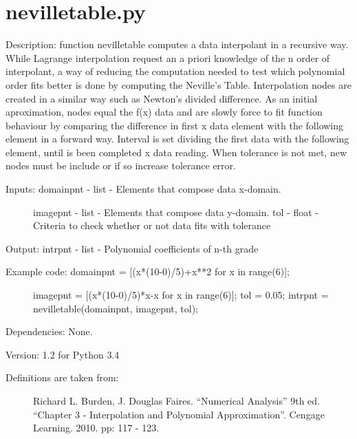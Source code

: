 \documentclass[letterpaper,10pt,oneside]{sphinxmanual}
\theoremstyle{plain}%
\theoremstyle{definition}%
\theoremstyle{remark}%
\begin{document}
\section{nevilletable.py}
\label{code:nevilletable-py}\label{code:module-nevilletable}
Description: function nevilletable computes a data interpolant in a recursive
way.  While Lagrange interpolation request an a priori knowledge of the n
order of interpolant, a way of reducing the computation needed to test
which polynomial order fits better is done by computing the Neville's Table.
Interpolation nodes are created in a similar way such as Newton's divided
difference. As an initial aproximation, nodes equal the f(x) data and are
slowly force to fit function behaviour by comparing the difference in first 
x data element with the following element in a forward way. Interval is set
dividing the first data with the following element, until is been completed
x data reading. When tolerance is not met, new nodes must be include or if 
so increase tolerance error.
\begin{description}
\item[{Inputs: domainpnt - list - Elements that compose data x-domain. }] \leavevmode
imagepnt - list - Elements that compose data y-domain.
tol - float - Criteria to check whether or not data fits with tolerance

\end{description}

Output: intrpnt - list - Polynomial coefficients of n-th grade
\begin{description}
\item[{Example code: domainpnt = {[}(x*(10-0)/5)+x**2 for x in range(6){]};}] \leavevmode
imagepnt = {[}(x*(10-0)/5)*x-x for x in range(6){]};
tol = 0.05;
intrpnt = nevilletable(domainpnt, imagepnt, tol);

\end{description}

Dependencies: None.

Version: 1.2 for Python 3.4
\begin{description}
\item[{Definitions are taken from:}] \leavevmode
Richard L. Burden, J. Douglas Faires. ``Numerical Analysis'' 9th ed.
``Chapter 3 - Interpolation and Polynomial Approximation''. 
Cengage Learning. 2010. pp: 117 - 123.

\end{description}
\end{document}
